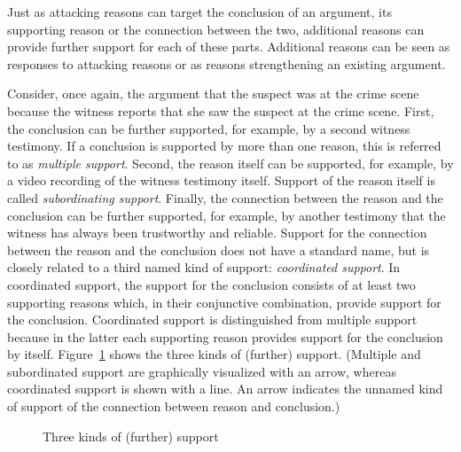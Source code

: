\documentclass[10pt]{article}
\begin{document}
Just as attacking reasons can target the conclusion of an argument, its supporting
reason or the connection between the two, additional reasons 
can provide further support for each of these parts. %
Additional reasons can be seen as responses to attacking reasons or as reasons strengthening an existing argument. 

Consider, once again, the argument that the suspect was at the crime scene because the witness reports that she saw the suspect at the crime scene. 
First, the conclusion can be further supported, for example, by a second witness testimony. 
If a conclusion is supported by more than one reason, this is referred 
to as \textit{multiple support}. 
%
Second, the reason itself can be supported, for example, 
by a video recording of the witness testimony itself. 
Support of the reason itself is called \textit{subordinating support}. 
%
Finally, the connection between the reason and the conclusion can be further supported, for example, 
by another testimony that the witness has always been trustworthy and reliable. 
Support for the connection between the reason and the conclusion does not have a standard name, but is closely related 
to a third named kind of support: \textit{coordinated support}. In coordinated support, the support for the conclusion consists of at least 
two supporting reasons which, in their conjunctive combination, provide support for the conclusion. Coordinated support is distinguished from multiple support because in the latter each supporting reason 
provides support for the conclusion by itself. 
%
Figure~\ref{fig:support} shows the three kinds of (further) support. (Multiple and subordinated support are graphically visualized with an arrow, whereas coordinated support is shown with a line. An arrow indicates the unnamed kind of support of the connection between reason and conclusion.)

\begin{figure}[bt]
\centering

\caption{Three kinds of (further) support\label{fig:support}}
\end{figure}


\end{document}
